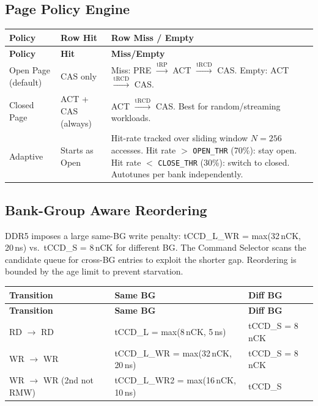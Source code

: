\documentclass[11pt,a4paper]{article}
\newcommand{\reg}[1]{\textcolor{ddrpurple}{\texttt{#1}}}
\begin{document}
\subsection{Page Policy Engine}

\begin{longtable}{L{3cm} L{4cm} L{7.5cm}}
\toprule
\textbf{Policy} & \textbf{Row Hit} & \textbf{Row Miss / Empty} \\
\midrule
\endfirsthead\toprule\textbf{Policy}&\textbf{Hit}&\textbf{Miss/Empty}\\\midrule\endhead
\bottomrule\endfoot
{}
Open Page (default)
  & CAS only
  & Miss: PRE $\xrightarrow{\text{tRP}}$ ACT $\xrightarrow{\text{tRCD}}$ CAS.
    Empty: ACT $\xrightarrow{\text{tRCD}}$ CAS. \\
Closed Page
  & ACT + CAS (always)
  & ACT $\xrightarrow{\text{tRCD}}$ CAS.
    Best for random/streaming workloads. \\
Adaptive
  & Starts as Open
  & Hit-rate tracked over sliding window $N=256$ accesses.
    Hit rate $>$ \reg{OPEN\_THR} (70\%): stay open.
    Hit rate $<$ \reg{CLOSE\_THR} (30\%): switch to closed.
    Autotunes per bank independently. \\
\end{longtable}

\subsection{Bank-Group Aware Reordering}

DDR5 imposes a large same-BG write penalty: tCCD\_L\_WR = max(32\,nCK, 20\,ns)
vs.\ tCCD\_S = 8\,nCK for different BG. The Command Selector scans the candidate
queue for cross-BG entries to exploit the shorter gap. Reordering is bounded
by the age limit to prevent starvation.

\begin{longtable}{L{4.5cm} L{3.5cm} L{3.5cm}}
\toprule
\textbf{Transition} & \textbf{Same BG} & \textbf{Diff BG} \\
\midrule
\endfirsthead\toprule\textbf{Transition}&\textbf{Same BG}&\textbf{Diff BG}\\\midrule\endhead
\bottomrule\endfoot
{}
RD $\to$ RD    & tCCD\_L = max(8\,nCK, 5\,ns)       & tCCD\_S = 8\,nCK \\
WR $\to$ WR    & tCCD\_L\_WR = max(32\,nCK, 20\,ns) & tCCD\_S = 8\,nCK \\
WR $\to$ WR (2nd not RMW) & tCCD\_L\_WR2 = max(16\,nCK, 10\,ns) & tCCD\_S \\
\end{longtable}
\end{document}
